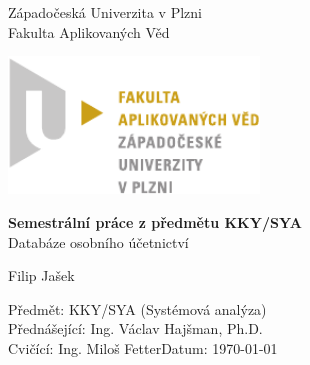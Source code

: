 \begin{titlepage}
    \begin{center}
        \LARGE
        Západočeská Univerzita v Plzni\\
        Fakulta Aplikovaných Věd\\
        
        \vspace{1cm}
        
        \includegraphics[width=0.5\textwidth]{./Graphics/FAV_logo.pdf}
        
        \vspace{4cm}
        
        \textbf{Semestrální práce z předmětu KKY/SYA}\\
        Databáze osobního účetnictví
        
        \vspace{0.5cm}
        Filip Jašek
        
    \end{center} 
    \vfill
        \noindent
        \large
        Předmět: KKY/SYA (Systémová analýza)\\
        Přednášející: Ing. Václav Hajšman, Ph.D.\\
        Cvičící: Ing. Miloš Fetter\hfill Datum: \today
\end{titlepage}